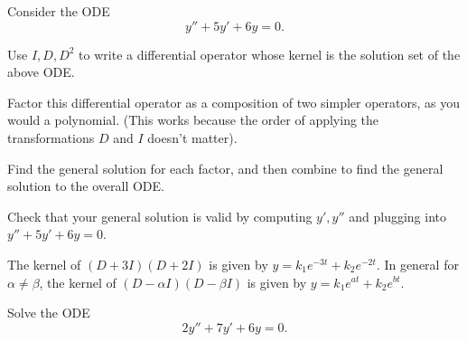 \begin{applicationActivities}
\begin{activity}{15}
Consider the ODE \[y''+5y'+6y=0.\]
\vfill
\begin{subactivity}
Use \(I,D,D^2\) to write a differential operator whose kernel is the solution set of the above ODE.
\end{subactivity}
\begin{subactivity}
Factor this differential operator as a composition of two simpler operators, as you would a polynomial. 
(This works because the order of applying the transformations \(D\) and \(I\) doesn't matter).
\end{subactivity}
\begin{subactivity}
Find the general solution for each factor, and then combine to find the general solution
to the overall ODE.
\end{subactivity}
\begin{subactivity}
Check that your general solution is valid by computing \(y',y''\) and plugging into
\(y''+5y'+6y=0\).
\end{subactivity}
\end{activity}

\begin{observation}
The kernel of \((D+3I)(D+2I)\) is given by \(y=k_1e^{-3t}+k_2e^{-2t}\).
\vfill
In general for \(\alpha\not=\beta\), the kernel of \((D-\alpha I)(D-\beta I)\) is given by
\(y=k_1e^{at}+k_2e^{bt}\).
\vfill
\end{observation}
%
%


\begin{activity}{10}
Solve the ODE \[ 2y''+7y'+6y=0.\]
\end{activity}


\end{applicationActivities}
